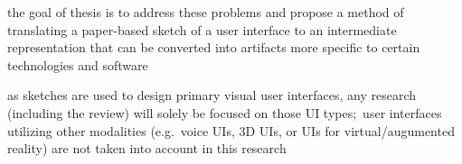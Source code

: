 the goal of thesis is to address these problems and propose a method
of translating a paper-based sketch of a user interface
to an intermediate representation that can be converted into artifacts
more specific to certain technologies and software

as sketches are used to design primary visual user interfaces, any research (including the review) will solely be focused on those UI types;\ user interfaces utilizing other modalities (e.g.\ voice UIs, 3D UIs, or UIs for virtual/augumented reality) are not taken into account in this research
